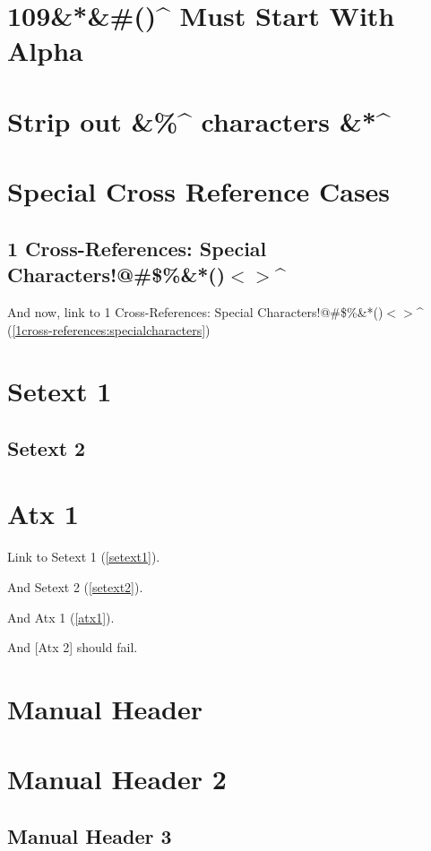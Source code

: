 
\def\mytitle{MultiMarkdown Autoreference Test}
\def\latexmode{memoir}


\chapter{109\&*\&\#()\^{} Must Start With Alpha}
\label{109muststartwithalpha}

\chapter{Strip out \&\%\^{} characters \&*\^{}}
\label{stripoutcharacters}

\chapter{Special Cross Reference Cases}
\label{specialcrossreferencecases}

\section{1 Cross-References: Special Characters!@\#\$\%\&*()$<$$>$\^{}}
\label{1cross-references:specialcharacters}

And now, link to 1 Cross-References: Special Characters!@\#\$\%\&*()$<$$>$\^{} (\autoref{1cross-references:specialcharacters})

\chapter{Setext 1}
\label{setext1}

\section{Setext 2}
\label{setext2}

\chapter{Atx 1}
\label{atx1}

Link to Setext 1 (\autoref{setext1}).

And Setext 2 (\autoref{setext2}).

And Atx 1 (\autoref{atx1}).

And [Atx 2] should fail.

\chapter{Manual Header}
\label{label}

\chapter{Manual Header 2}
\label{label2}

\section{Manual Header 3}
\label{label3}




